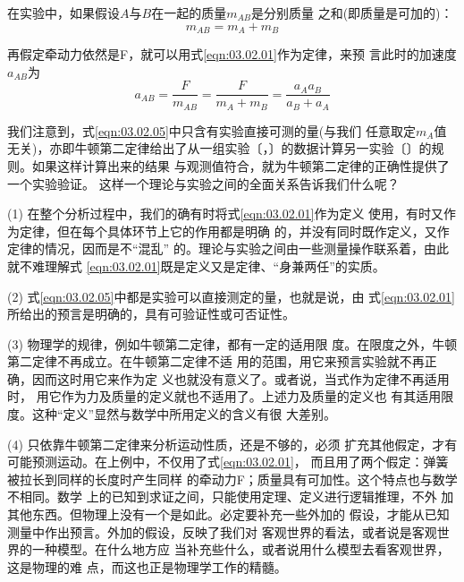 在实验中，如果假设$ A $与$ B $在一起的质量$ m_{AB} $是分别质量
之和(即质量是可加的)：
\begin{equation}\label{eqn:03.02.04}
    m _ { A B } = m _ { A } + m _ { B }
\end{equation}

再假定牵动力依然是F，就可以用式\eqref{eqn:03.02.01}作为定律，来预
言此时的加速度$ a_{AB} $为
\begin{equation}\label{eqn:03.02.05}
    a _ { A B } = \frac { F } { m _ { A B } } = \frac { F } { m _ { A } + m _ { B } } = \frac { a _ { A } a _ { B } } { a _ { B } + a _ { A } }
\end{equation}

{我们注意到，式\eqref{eqn:03.02.05}中只含有实验直接可测的量(与我们
任意取定$ m_A $值无关)，亦即牛顿第二定律给出了从一组实验〔，〕的数据计算另一实验〔〕的规则。如果这样计算出来的结果
与观测值符合，就为牛顿第二定律的正确性提供了一个实验验证。
这样一个理论与实验之间的全面关系告诉我们什么呢？}

(1) 在整个分析过程中，我们的确有时将式\eqref{eqn:03.02.01}作为定义
使用，有时又作为定律，但在每个具体环节上它的作用都是明确
的，并没有同时既作定义，又作定律的情况，因而是不“混乱”
的。理论与实验之间由一些测量操作联系着，由此就不难理解式
\eqref{eqn:03.02.01}既是定义又是定律、“身兼两任”的实质。

(2) 式\eqref{eqn:03.02.05}中都是实验可以直接测定的量，也就是说，由
式\eqref{eqn:03.02.01}所给出的预言是明确的，具有可验证性或可否证性。

(3) 物理学的规律，例如牛顿第二定律，都有一定的适用限
度。在限度之外，牛顿第二定律不再成立。在牛顿第二定律不适
用的范围，用它来预言实验就不再正确，因而这时用它来作为定
义也就没有意义了。或者说，当式作为定律不再适用时，
用它作为力及质量的定义就也不适用了。上述力及质量的定义也
有其适用限度。这种“定义”显然与数学中所用定义的含义有很
大差别。

(4) 只依靠牛顿第二定律来分析运动性质，还是不够的，必须
扩充其他假定，才有可能预测运动。在上例中，不仅用了式\eqref{eqn:03.02.01}，
而且用了两个假定：弹簧被拉长到同样的长度时产生同样
的牵动力F；质量具有可加性。这个特点也与数学不相同。数学
上的已知到求证之间，只能使用定理、定义进行逻辑推理，不外
加其他东西。但物理上没有一个是如此。必定要补充一些外加的
假设，才能从已知测量中作出预言。外加的假设，反映了我们对
客观世界的看法，或者说是客观世界的一种模型。在什么地方应
当补充些什么，或者说用什么模型去看客观世界，这是物理的难
点，而这也正是物理学工作的精髓。


